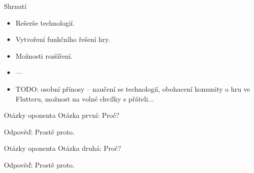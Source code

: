 \documentclass[czech,aspectratio=169]{beamer}
\begin{document}
  \begin{frame}{Shrnutí}
    \begin{itemize}
      \item Rešerše technologií.
      \item Vytvoření funkčního řešení hry.
      \item Možnosti rozšíření.
      \item ---
      \item TODO: osobní přínosy -- naučení se technologií, obohacení komunity o hru ve Flutteru, možnost na volné chvilky s přáteli...
    \end{itemize}
  \end{frame}

  \begin{frame}[noframenumbering]{Otázky oponenta}
    Otázka první: Proč?

    \vfill

    Odpověď: Prostě proto.
  \end{frame}

  \begin{frame}[noframenumbering]{Otázky oponenta}
    Otázka druhá: Proč?

    \vfill

    Odpověď: Prostě proto.
  \end{frame}
\end{document}

